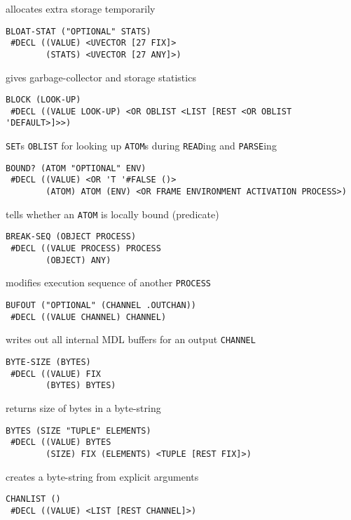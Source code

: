 \documentclass[a4paper]{scrbook}
\begin{document}
allocates extra storage temporarily

\begin{verbatim}
BLOAT-STAT ("OPTIONAL" STATS)
 #DECL ((VALUE) <UVECTOR [27 FIX]>
        (STATS) <UVECTOR [27 ANY]>)
\end{verbatim}

gives garbage-collector and storage statistics

\begin{verbatim}
BLOCK (LOOK-UP)
 #DECL ((VALUE LOOK-UP) <OR OBLIST <LIST [REST <OR OBLIST 'DEFAULT>]>>)
\end{verbatim}

\texttt{SET}s \texttt{OBLIST} for looking up \texttt{ATOM}s during \texttt{READ}ing and \texttt{PARSE}ing

\begin{verbatim}
BOUND? (ATOM "OPTIONAL" ENV)
 #DECL ((VALUE) <OR 'T '#FALSE ()>
        (ATOM) ATOM (ENV) <OR FRAME ENVIRONMENT ACTIVATION PROCESS>)
\end{verbatim}

tells whether an \texttt{ATOM} is locally bound (predicate)

\begin{verbatim}
BREAK-SEQ (OBJECT PROCESS)
 #DECL ((VALUE PROCESS) PROCESS
        (OBJECT) ANY)
\end{verbatim}

modifies execution sequence of another \texttt{PROCESS}

\begin{verbatim}
BUFOUT ("OPTIONAL" (CHANNEL .OUTCHAN))
 #DECL ((VALUE CHANNEL) CHANNEL)
\end{verbatim}

writes out all internal MDL buffers for an output \texttt{CHANNEL}

\begin{verbatim}
BYTE-SIZE (BYTES)
 #DECL ((VALUE) FIX
        (BYTES) BYTES)
\end{verbatim}

returns size of bytes in a byte-string

\begin{verbatim}
BYTES (SIZE "TUPLE" ELEMENTS)
 #DECL ((VALUE) BYTES
        (SIZE) FIX (ELEMENTS) <TUPLE [REST FIX]>)
\end{verbatim}

creates a byte-string from explicit arguments

\begin{verbatim}
CHANLIST ()
 #DECL ((VALUE) <LIST [REST CHANNEL]>)
\end{verbatim}
\end{document}
